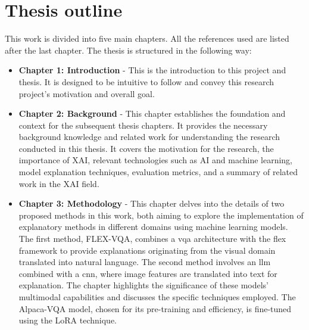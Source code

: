 \label{sec:1_7_thesis_outline}

\begin{comment}
Describe how you have divided your thesis into chapters, and briefly list what the reader will find in each chapter.
\end{comment}

\section{Thesis outline}

This work is divided into five main chapters.
All the references used are listed after the last chapter. 
The thesis is structured in the following way:

\begin{itemize}

    \item \textbf{Chapter 1: Introduction} - This is the introduction to this project and thesis. It is designed to be intuitive to follow and convey this research project's motivation and overall goal.
    
    \item \textbf{Chapter 2: Background} - This chapter establishes the foundation and context for the subsequent thesis chapters. It provides the necessary background knowledge and related work for understanding the research conducted in this thesis. It covers the motivation for the research, the importance of XAI, relevant technologies such as AI and machine learning, model explanation techniques, evaluation metrics, and a summary of related work in the XAI field.
    
    \item \textbf{Chapter 3: Methodology} - This chapter delves into the details of two proposed methods in this work, both aiming to explore the implementation of explanatory methods in different domains using machine learning models. The first method, FLEX-VQA, combines a \gls{vqa} architecture with the \gls{flex} framework to provide explanations originating from the visual domain translated into natural language. The second method involves an \gls{llm} combined with a \gls{cnn}, where image features are translated into text for explanation. 
    The chapter highlights the significance of these models' multimodal capabilities and discusses the specific techniques employed. The Alpaca-VQA model, chosen for its pre-training and efficiency, is fine-tuned using the LoRA technique.


\end{itemize}

